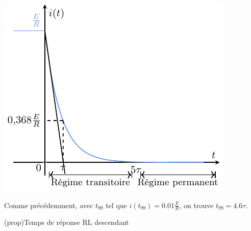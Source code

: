\documentclass[../../main/main.tex]{subfiles}
\begin{document}
\begin{tcb*}[label=impl:déterm, sidebyside, righthand ratio=.4]
{      \includegraphics[width=\linewidth]{carac_rl-tau_decharge}
    }%
	\end{tcb*}
Comme précédemment, avec $t_{99}$ tel que $i(t_{99}) = \num{0.01}\frac{E}{R}$,
on trouve $t_{99} = \num{4.6}\tau$.
\begin{tcb*}(prop){Temps de réponse RL descendant}
	{}
\end{tcb*}
\end{document}
